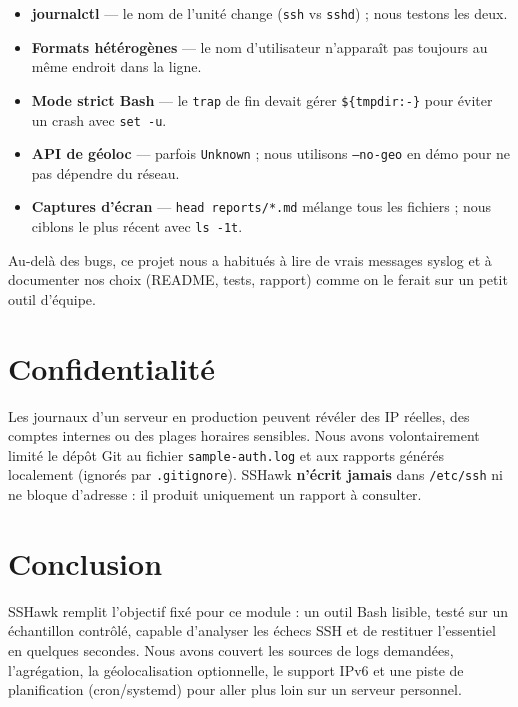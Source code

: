 \documentclass[11pt,a4paper]{article}
\begin{document}
\begin{pointbox}
  \begin{itemize}[leftmargin=*]
    \item \textbf{journalctl} — le nom de l'unité change (\texttt{ssh} vs \texttt{sshd}) ; nous testons les deux.
    \item \textbf{Formats hétérogènes} — le nom d'utilisateur n'apparaît pas toujours au même endroit dans la ligne.
    \item \textbf{Mode strict Bash} — le \texttt{trap} de fin devait gérer \texttt{\$\{tmpdir:-\}} pour éviter un crash avec \texttt{set -u}.
    \item \textbf{API de géoloc} — parfois \texttt{Unknown} ; nous utilisons \texttt{--no-geo} en démo pour ne pas dépendre du réseau.
    \item \textbf{Captures d'écran} — \texttt{head reports/*.md} mélange tous les fichiers ; nous ciblons le plus récent avec \texttt{ls -1t}.
  \end{itemize}
\end{pointbox}

Au-delà des bugs, ce projet nous a habitués à lire de vrais messages syslog et à documenter nos choix
(README, tests, rapport) comme on le ferait sur un petit outil d'équipe.

\section{Confidentialité}

\begin{alertbox}
Les journaux d'un serveur en production peuvent révéler des IP réelles, des comptes internes ou des plages horaires sensibles.
Nous avons volontairement limité le dépôt Git au fichier \texttt{sample-auth.log} et aux rapports générés localement
(ignorés par \texttt{.gitignore}). SSHawk \textbf{n'écrit jamais} dans \texttt{/etc/ssh} ni ne bloque d'adresse :
il produit uniquement un rapport à consulter.
\end{alertbox}

\section{Conclusion}

SSHawk remplit l'objectif fixé pour ce module : un outil Bash lisible, testé sur un échantillon contrôlé,
capable d'analyser les échecs SSH et de restituer l'essentiel en quelques secondes.
Nous avons couvert les sources de logs demandées, l'agrégation, la géolocalisation optionnelle, le support IPv6
et une piste de planification (cron/systemd) pour aller plus loin sur un serveur personnel.
\end{document}

